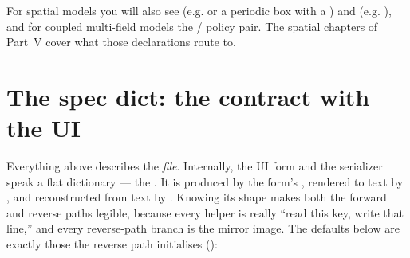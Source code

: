 For spatial models you will also see  (e.g.
 or a periodic box with a ) and
 (e.g. ), and for
coupled multi-field models the  /
 policy pair. The spatial chapters of Part~V cover
what those declarations route to.

\section{The spec dict: the contract with the UI}\label{sec:tf-spec}

Everything above describes the \emph{file}. Internally, the UI form and the
serializer speak a flat dictionary --- the . It is produced by the
form's , rendered to text by , and
reconstructed from text by . Knowing its shape makes
both the forward and reverse paths legible, because every  helper
is really ``read this key, write that line,'' and every reverse-path branch is the
mirror image. The defaults below are exactly those the reverse path initialises
():

